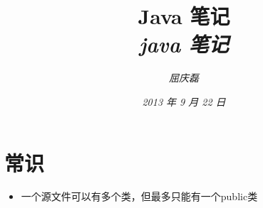 \documentclass{article}
\begin{document}
\title{%
  {\huge \textsf{Java 笔记}\\\smallskip}%
  {\small \textit{java 笔记}}
}

\author{\textit{屈庆磊}\\[2mm]
       }

\date{\textit{2013 年 9 月 22 日}}

\maketitle
\begin{multicols}{2}
\tableofcontents
\end{multicols}

\section{常识}
\begin{itemize}
\item 一个源文件可以有多个类，但最多只能有一个public类
\end{itemize}
\end{document}
